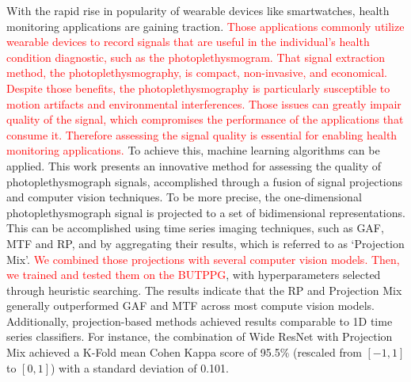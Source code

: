 

With the rapid rise in popularity of wearable devices like smartwatches, health monitoring applications are gaining traction. 
\textcolor{red}{Those applications commonly utilize wearable devices to record signals that are useful in the individual's health condition diagnostic, such as the photoplethysmogram. That signal extraction method, the photoplethysmography, is compact, non-invasive, and economical. Despite those benefits, the photoplethysmography is particularly susceptible to motion artifacts and environmental interferences. Those issues can greatly impair quality of the signal, which compromises the performance of the applications that consume it. Therefore  assessing the signal quality is essential for enabling health monitoring applications. }
%
To achieve this, machine learning algorithms can be applied. This work presents an innovative method for assessing the quality of photoplethysmograph signals, accomplished through a fusion of signal projections and computer vision techniques. To be more precise, the one-dimensional photoplethysmograph signal is projected to a set of bidimensional representations. This can be accomplished using time series imaging techniques, such as \acrlong{GAF}, \acrlong{MTF} and \acrlong{RP}, and by aggregating their results, which is referred to as `Projection Mix'. \textcolor{red}{We combined those projections with several computer vision models. Then, we trained and tested them on the \acrlong{BUTPPG}}, with hyperparameters selected through heuristic searching. The results indicate that the \acrlong{RP} and Projection Mix generally outperformed \acrlong{GAF} and \acrlong{MTF} across most compute vision models. Additionally, projection-based methods achieved results comparable to 1D time series classifiers. For instance, the combination of Wide ResNet with Projection Mix achieved a K-Fold mean Cohen Kappa score of 95.5\% (rescaled from $[-1,1]$ to $[0,1]$) with a standard deviation of 0.101. 
